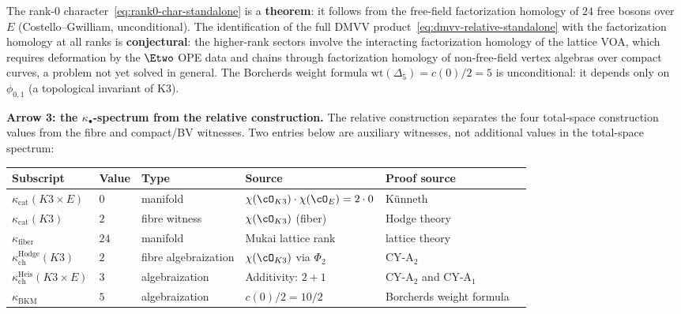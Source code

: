 \begin{remark}
\label{rem:relative-scope-standalone}
The rank-$0$ character~\eqref{eq:rank0-char-standalone} is a
\textbf{theorem}: it follows from the free-field factorization
homology of $24$ free bosons over~$E$ (Costello--Gwilliam,
unconditional). The identification of the full DMVV
product~\eqref{eq:dmvv-relative-standalone} with the factorization
homology at all ranks is \textbf{conjectural}: the higher-rank
sectors involve the interacting factorization homology of the lattice
VOA, which requires deformation by the $\Etwo$ OPE data and chains
through factorization homology of non-free-field vertex algebras over
compact curves, a problem not yet solved in general. The Borcherds
weight formula $\mathrm{wt}(\Delta_5) = c(0)/2 = 5$ is
unconditional: it depends only on $\phi_{0,1}$ (a topological
invariant of K3).
\end{remark}

\medskip
\noindent\textbf{Arrow 3: the $\kappa_\bullet$-spectrum from the relative construction.}
The relative construction separates the four total-space construction
values from the fibre and compact/BV witnesses. Two entries below are
auxiliary witnesses, not additional values in the total-space spectrum:

\begin{center}
\renewcommand{\arraystretch}{1.3}
\begin{tabular}{llllll}
 \toprule
 \textbf{Subscript} & \textbf{Value} & \textbf{Type} & \textbf{Source} & \textbf{Proof source} \\
 \midrule
 $\kappa_{\mathrm{cat}}(K3 \times E)$ & $0$ & manifold & $\chi(\cO_{K3}) \cdot \chi(\cO_E) = 2 \cdot 0$ & K\"unneth \\
 $\kappa_{\mathrm{cat}}(K3)$ & $2$ & fibre witness & $\chi(\cO_{K3})$ (fiber) & Hodge theory \\
 $\kappa_{\mathrm{fiber}}$ & $24$ & manifold & Mukai lattice rank & lattice theory \\
 $\kappa_{\mathrm{ch}}^{\mathrm{Hodge}}(K3)$ & $2$ & fibre algebraization & $\chi(\cO_{K3})$ via $\Phi_2$ & CY-A$_2$ \\
 $\kappa_{\mathrm{ch}}^{\mathrm{Heis}}(K3 \times E)$ & $3$ & algebraization & Additivity: $2 + 1$ & CY-A$_2$ and CY-A$_1$ \\
 $\kappa_{\mathrm{BKM}}$ & $5$ & algebraization & $c(0)/2 = 10/2$ & Borcherds weight formula \\
 \bottomrule
\end{tabular}
\end{center}

